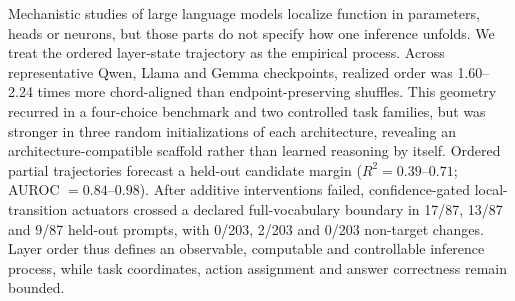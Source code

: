 Mechanistic studies of large language models localize function in parameters, heads or neurons, but those parts do not specify how one inference unfolds. We treat the ordered layer-state trajectory as the empirical process. Across representative Qwen, Llama and Gemma checkpoints, realized order was 1.60--2.24 times more chord-aligned than endpoint-preserving shuffles. This geometry recurred in a four-choice benchmark and two controlled task families, but was stronger in three random initializations of each architecture, revealing an architecture-compatible scaffold rather than learned reasoning by itself. Ordered partial trajectories forecast a held-out candidate margin ($R^2=0.39$--$0.71$; AUROC $=0.84$--$0.98$). After additive interventions failed, confidence-gated local-transition actuators crossed a declared full-vocabulary boundary in 17/87, 13/87 and 9/87 held-out prompts, with 0/203, 2/203 and 0/203 non-target changes. Layer order thus defines an observable, computable and controllable inference process, while task coordinates, action assignment and answer correctness remain bounded.
